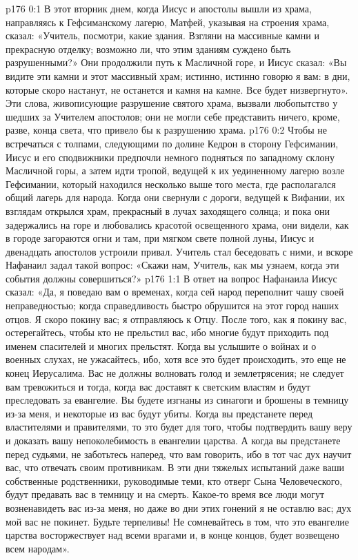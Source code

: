 \vs p176 0:1 В этот вторник днем, когда Иисус и апостолы вышли из храма, направляясь к Гефсиманскому лагерю, Матфей, указывая на строения храма, сказал: «Учитель, посмотри, какие здания. Взгляни на массивные камни и прекрасную отделку; возможно ли, что этим зданиям суждено быть разрушенными?» Они продолжили путь к Масличной горе, и Иисус сказал: «Вы видите эти камни и этот массивный храм; истинно, истинно говорю я вам: в дни, которые скоро настанут, не останется и камня на камне. Все будет низвергнуто». Эти слова, живописующие разрушение святого храма, вызвали любопытство у шедших за Учителем апостолов; они не могли себе представить ничего, кроме, разве, конца света, что привело бы к разрушению храма.
\vs p176 0:2 Чтобы не встречаться с толпами, следующими по долине Кедрон в сторону Гефсимании, Иисус и его сподвижники предпочли немного подняться по западному склону Масличной горы, а затем идти тропой, ведущей к их уединенному лагерю возле Гефсимании, который находился несколько выше того места, где располагался общий лагерь для народа. Когда они свернули с дороги, ведущей к Вифании, их взглядам открылся храм, прекрасный в лучах заходящего солнца; и пока они задержались на горе и любовались красотой освещенного храма, они видели, как в городе загораются огни и там, при мягком свете полной луны, Иисус и двенадцать апостолов устроили привал. Учитель стал беседовать с ними, и вскоре Нафанаил задал такой вопрос: «Скажи нам, Учитель, как мы узнаем, когда эти события должны совершиться?»
\vs p176 1:1 В ответ на вопрос Нафанаила Иисус сказал: «Да, я поведаю вам о временах, когда сей народ переполнит чашу своей неправедностью; когда справедливость быстро обрушится на этот город наших отцов. Я скоро покину вас; я отправляюсь к Отцу. После того, как я покину вас, остерегайтесь, чтобы кто не прельстил вас, ибо многие будут приходить под именем спасителей и многих прельстят. Когда вы услышите о войнах и о военных слухах, не ужасайтесь, ибо, хотя все это будет происходить, это еще не конец Иерусалима. Вас не должны волновать голод и землетрясения; не следует вам тревожиться и тогда, когда вас доставят к светским властям и будут преследовать за евангелие. Вы будете изгнаны из синагоги и брошены в темницу из\hyp{}за меня, и некоторые из вас будут убиты. Когда вы предстанете перед властителями и правителями, то это будет для того, чтобы подтвердить вашу веру и доказать вашу непоколебимость в евангелии царства. А когда вы предстанете перед судьями, не заботьтесь наперед, что вам говорить, ибо в тот час дух научит вас, что отвечать своим противникам. В эти дни тяжелых испытаний даже ваши собственные родственники, руководимые теми, кто отверг Сына Человеческого, будут предавать вас в темницу и на смерть. Какое\hyp{}то время все люди могут возненавидеть вас из\hyp{}за меня, но даже во дни этих гонений я не оставлю вас; дух мой вас не покинет. Будьте терпеливы! Не сомневайтесь в том, что это евангелие царства восторжествует над всеми врагами и, в конце концов, будет возвещено всем народам».
